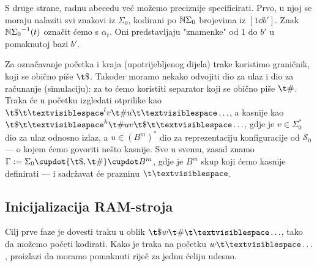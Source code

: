S druge strane, radnu abecedu već možemo preciznije specificirati. Prvo, u njoj se moraju nalaziti svi znakovi iz $\Sigma_0$, kodirani po ${\mathbb N}\Sigma_0$ brojevima iz $[1\dd b']$. Znak ${{\mathbb N}\Sigma_0}^{-1}(t)$ označit ćemo s $\alpha_t$. Oni predstavljaju "znamenke" od $1$ do $b'$ u pomaknutoj bazi $b'$. 

Za označavanje početka i kraja (upotrijebljenog dijela) trake koristimo graničnik, koji se obično piše $\t\$$. Također moramo nekako odvojiti dio za ulaz i dio za računanje (simulaciju): za to ćemo koristiti separator koji se obično piše $\t\#$. Traka će u početku izgledati otprilike kao $\t\$\bl^lv\t\#u\bl\ldots$, a kasnije kao $\t\$\bl^k\t\#uv\t\$\bl\ldots$, gdje je $v\in\Sigma_0^*$ dio za ulaz odnosno izlaz, a $u\in(B^m)^*$ dio za reprezentaciju konfiguracije od $\mathcal S_0$ --- o kojem ćemo govoriti nešto kasnije. Sve u svemu, zasad znamo
    $\Gamma:=\Sigma_0\dcup\{\t\$,\t\#\}\dcup B^m$,
gdje je $B^m$ skup koji ćemo kasnije definirati --- i sadržavat će prazninu $\bl$.

\subsection{Inicijalizacija RAM-stroja}

Cilj prve faze je dovesti traku u oblik $\t\$w\t\#\bl\ldots$, tako da možemo početi kodirati. Kako je traka na početku $w\bl\ldots$, proizlazi da moramo pomaknuti riječ za jednu ćeliju udesno.

